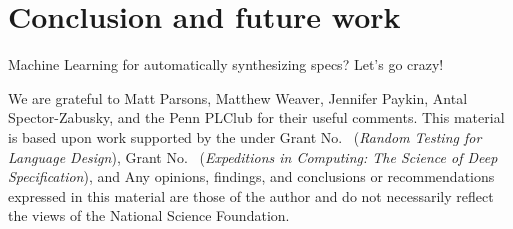 \documentclass[acmsmall,review]{acmart}\settopmatter{}
\begin{document}

\section{Conclusion and future work}
\label{sec:concl}

Machine Learning for automatically synthesizing specs? Let's go crazy!

\begin{acks}                            %
We are grateful to
%
Matt Parsons,
Matthew Weaver,
Jennifer Paykin,
Antal Spector-Zabusky,
and the Penn PLClub 
for their useful comments. 
This material is based upon work supported by the
 under Grant
No.~ ({\em Random Testing for Language
Design}), Grant No.~ ({\em Expeditions
in Computing: The Science of Deep Specification}), and  Any opinions, findings, and
conclusions or recommendations expressed in this material are those of
the author and do not necessarily reflect the views of the National
Science Foundation.

\end{acks}

%



% 
\end{document}
